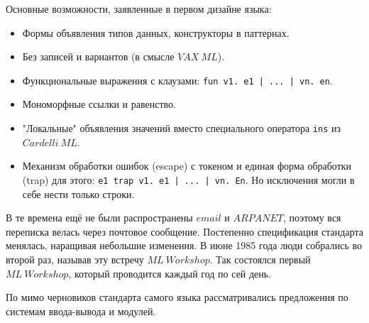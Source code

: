 \documentclass[14pt]{matmex-diploma-custom}
\begin{document}
Основные возможности, заявленные в первом дизайне языка:
\begin{itemize}
\item Формы объявления типов данных, конструкторы в паттернах.
\item Без записей и вариантов (в смысле $V\!AX\ M\!L$).
\item Функциональные выражения с клаузами: \verb=fun v1. e1 | ... | vn. en=.
\item Мономорфные ссылки и равенство.
\item "Локальные" объявления значений вместо специального оператора \verb=ins= из $Cardelli\ M\!L$.
\item Механизм обработки ошибок (escape) с токеном и единая форма обработки (trap) для этого: \verb=e1 trap v1. e1 | ... | vn. En=. Но исключения могли в себе нести только строки.
\end{itemize}
%


В те времена ещё не были распространены $email$ и $ARPANET$, поэтому вся переписка велась через почтовое сообщение. Постепенно спецификация стандарта менялась, наращивая небольшие изменения. В июне 1985 года люди собрались во второй раз, называв эту встречу $ML\ Workshop$. Так состоялся первый $ML\ Workshop$, который проводится каждый год по сей день.

По мимо черновиков стандарта самого языка рассматривались предложения по системам ввода-вывода и модулей.

\end{document}
